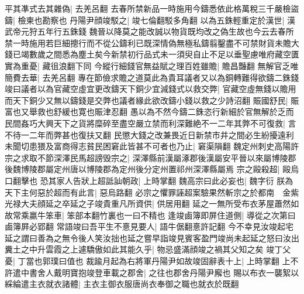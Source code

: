 平其凖式去其雜偽|{
	去羌呂翻}
去春所禁新品一時施用今鑄悉依此格萬稅三千嚴檢盜鑄|{
	檢柬也勘察也}
丹陽尹顔竣駁之|{
	竣七倫翻駁多角翻}
以為五銖輕重定於漢世|{
	漢武帝元狩五年行五銖錢}
魏晉以降莫之能改誠以物貨既均改之偽生故也今云去春所禁一時施用若巨細摠行而不從公鑄利已既深情偽無極私鑄翦鑿盡不可禁財貨未贍大錢已竭數歲之間悉為塵土矣今新禁初行品式未一須臾自止不足以垂聖慮唯府藏空匱實為重憂|{
	藏徂浪翻下同}
今縱行細錢官無益賦之理百姓雖贍|{
	贍昌豔翻}
無解官乏唯簡費去華|{
	去羌呂翻}
專在節儉求贍之道莫此為貴耳議者又以為銅轉難得欲鑄二銖錢竣曰議者以為官藏空虛宜更改鑄天下銅少宜減錢式以救交弊|{
	官藏空虛無錢以贍用而天下銅少又無以鑄錢是交弊也議者緣此欲改鑄小錢以救之少詩沼翻}
賑國舒民|{
	賑富也又舉救也舒緩也寛也賑津忍翻}
愚以為不然今鑄二銖恣行新細於官無解於乏而民間姦巧大興天下之貨將糜碎至盡空嚴立禁而利深難絶不一二年其弊不可復救|{
	言不待一二年而弊甚也復扶又翻}
民懲大錢之改兼畏近日新禁市井之間必生紛擾遠利未聞切患猥及富商得志貧民困窘此皆甚不可者也乃止|{
	窘渠隕翻}
魏定州刺史高陽許宗之求取不節深澤民馬超謗毁宗之|{
	深澤縣前漢屬涿郡後漢屬安平晉以來屬博陵郡後魏博陵郡屬定州唐以博陵郡為定州後分定州置祁州深澤縣屬焉}
宗之毆殺超|{
	毆烏口翻擊也}
恐其家人告狀上超詆訕朝政|{
	上時掌翻}
魏高宗曰此必妄也|{
	魏字衍}
朕為天下主何惡於超而有此言|{
	惡烏路翻}
必宗之懼罪誣超案驗果然斬宗之於都南　金紫光禄大夫顔延之卒延之子竣貴重凡所資供|{
	供居用翻}
延之一無所受布衣茅屋蕭然如故常乘羸牛笨車|{
	笨部本翻竹裏也一曰不精也}
逢竣鹵簿即屏住道側|{
	導從之次第曰鹵簿屛必郢翻}
常語竣曰吾平生不憙見要人|{
	語牛倨翻憙許記翻}
今不幸見汝竣起宅延之謂曰善為之無令後人笑汝拙也延之嘗早詣竣見賓客盈門竣尚未起延之怒曰汝出糞土之中升雲霞之上遽驕傲如此其能久乎|{
	物忌盛滿顔竣之禍其父知之矣}
竣丁父憂|{
	丁當也郭璞曰值也}
裁踰月起為右將軍丹陽尹如故竣固辭表十上|{
	上時掌翻}
上不許遣中書舍人戴明寶抱竣登車載之郡舍|{
	之往也郡舍丹陽尹廨也}
賜以布衣一襲絮以綵綸遣主衣就衣諸體|{
	主衣主御衣服唐尚衣奉御之職也就衣於既翻}


